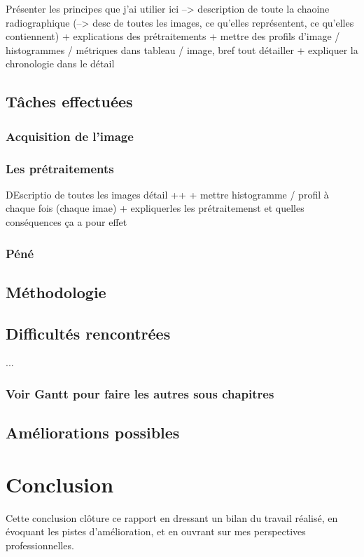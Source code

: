 \documentclass[12pt,a4paper]{report}
\begin{document}
Présenter les principes que j'ai utilier ici --> description de toute la chaoine radiographique (--> desc de toutes les images, ce qu'elles représentent, ce qu'elles contiennent) + explications des prétraitements + mettre des profils d'image / histogrammes / métriques dans tableau / image, bref tout détailler  + expliquer la chronologie dans le détail

\section{Tâches effectuées}
\subsection{Acquisition de l'image}
\subsection{Les prétraitements}

DEscriptio de toutes les images détail ++ + mettre histogramme / profil à chaque fois (chaque imae) + expliquerles les prétraitemenst et quelles conséquences ça a pour effet



\subsection{Péné}
\section{Méthodologie}
\section{Difficultés rencontrées}
... %
\subsection{Voir Gantt pour faire les autres sous chapitres}
\section{Améliorations possibles}


\chapter{Conclusion}

Cette conclusion clôture ce rapport en dressant un bilan du travail réalisé, en évoquant les pistes d'amélioration, et en ouvrant sur mes perspectives professionnelles.
\end{document}
